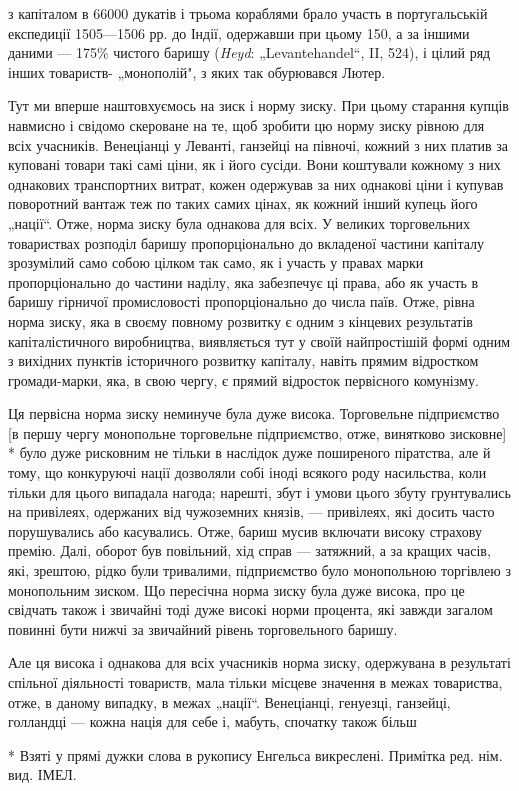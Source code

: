\parcont{}  %
з капіталом в 66000 дукатів і трьома кораблями брало участь в португальській експедиції 1505—1506 рр. до Індії, одержавши
при цьому 150, а за іншими даними — 175\% чистого баришу (\emph{Heyd}: „Levantehandel“, II, 524), і цілий ряд інших товариств-
„монополій", з яких так обурювався Лютер.

Тут ми вперше наштовхуємось на зиск і норму зиску. При цьому старання купців
навмисно і свідомо скероване на те, щоб зробити цю норму зиску рівною для всіх учасників. Венеціанці у Леванті, ганзейці на
півночі, кожний з них платив за куповані товари такі самі ціни, як і його сусіди. Вони коштували кожному з них однакових
транспортних витрат, кожен одержував за них однакові ціни і купував поворотний вантаж теж по таких самих цінах, як кожний
інший купець його „нації“. Отже, норма зиску була однакова для всіх. У великих торговельних товариствах розподіл баришу
пропорціонально до вкладеної частини капіталу зрозумілий само собою цілком так само, як і участь у правах марки
пропорціонально до частини наділу, яка забезпечує ці права, або як участь в баришу гірничої промисловості пропорціонально
до числа паїв. Отже, рівна норма зиску, яка в своєму повному розвитку є одним з кінцевих результатів капіталістичного
виробництва, виявляється тут у своїй найпростішій формі одним з вихідних пунктів історичного розвитку капіталу, навіть
прямим відростком громади-марки, яка, в свою чергу, є прямий відросток первісного комунізму.

Ця первісна норма зиску
неминуче була дуже висока. Торговельне підприємство [в першу чергу монопольне торговельне підприємство, отже, винятково
зисковне] * було дуже рисковним не тільки в наслідок дуже поширеного піратства, але й тому, що конкуруючі нації дозволяли
собі іноді всякого роду насильства, коли тільки для цього випадала нагода; нарешті, збут і умови цього збуту грунтувались
на привілеях, одержаних від чужоземних князів, — привілеях, які досить часто порушувались або касувались. Отже, бариш
мусив включати високу страхову премію. Далі, оборот був повільний, хід справ — затяжний, а за кращих часів, які, зрештою,
рідко були тривалими, підприємство було монопольною торгівлею з монопольним зиском. Що пересічна норма зиску була дуже
висока, про це свідчать також і звичайні тоді дуже високі норми процента, які завжди загалом повинні бути нижчі за
звичайний рівень торговельного баришу.

Але ця висока і однакова для всіх учасників норма зиску, одержувана в результаті
спільної діяльності товариств, мала тільки місцеве значення в межах товариства, отже, в даному випадку, в межах „нації“.
Венеціанці, генуезці, ганзейці, голландці — кожна нація для себе і, мабуть, спочатку також більш

* Взяті у прямі дужки слова в рукопису Енгельса викреслені. Примітка ред. нім. вид. ІМЕЛ.
\parbreak{}  %
